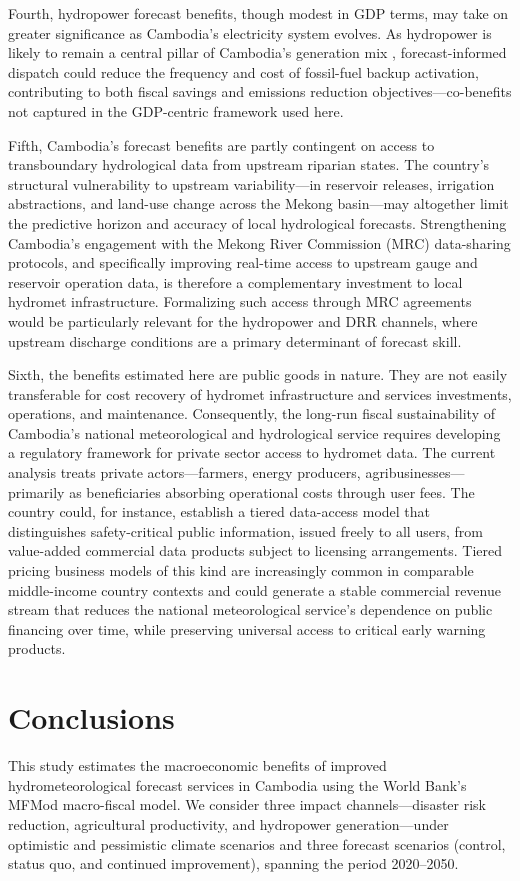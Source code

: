 \documentclass[
  final,
  10pt,
  letterpaper,
  english,
]{article}
\begin{document}
Fourth, hydropower forecast benefits, though modest in GDP terms, may take on
greater significance as Cambodia's electricity system evolves. As hydropower
is likely to remain a central pillar of Cambodia's generation mix \parencite{IES2024CambodiaPDP},
forecast-informed dispatch could reduce the frequency and cost of fossil-fuel
backup activation, contributing to both fiscal savings and emissions reduction
objectives---co-benefits not captured in the GDP-centric framework used here.

Fifth, Cambodia's forecast benefits are partly contingent on access to
transboundary hydrological data from upstream riparian states. The country’s
structural vulnerability to upstream variability—in reservoir releases,
irrigation abstractions, and land-use change across the Mekong basin—may
altogether limit the predictive horizon and accuracy of local hydrological
forecasts. Strengthening Cambodia's engagement with the Mekong River Commission
(MRC) data-sharing protocols, and specifically improving real-time access to
upstream gauge and reservoir operation data, is therefore a complementary
investment to local hydromet infrastructure. Formalizing such access through MRC
agreements would be particularly relevant for the hydropower and DRR channels,
where upstream discharge conditions are a primary determinant of forecast skill.

Sixth, the benefits estimated here are public goods in nature. They are not
easily transferable for cost recovery of hydromet infrastructure and services
investments, operations, and maintenance. Consequently, the long-run fiscal
sustainability of Cambodia's national meteorological and hydrological service
requires developing a regulatory framework for private sector access to hydromet
data. The current analysis treats private actors—farmers, energy producers,
agribusinesses—primarily as beneficiaries absorbing operational costs through
user fees. The country could, for instance, establish a tiered data-access model
that distinguishes safety-critical public information, issued freely to all
users, from value-added commercial data products subject to licensing
arrangements. Tiered pricing business models of this kind are increasingly
common in comparable middle-income country contexts and could generate a stable
commercial revenue stream that reduces the national meteorological service’s
dependence on public financing over time, while preserving universal access to
critical early warning products.


\FloatBarrier
\section{Conclusions}
\label{sec:conclusions}
This study estimates the macroeconomic benefits of improved hydrometeorological
forecast services in Cambodia using the World Bank's MFMod macro-fiscal model.
We consider three impact channels---disaster risk reduction, agricultural
productivity, and hydropower generation---under optimistic and pessimistic climate
scenarios and three forecast scenarios (control, status quo, and continued
improvement), spanning the period 2020--2050.
\end{document}
